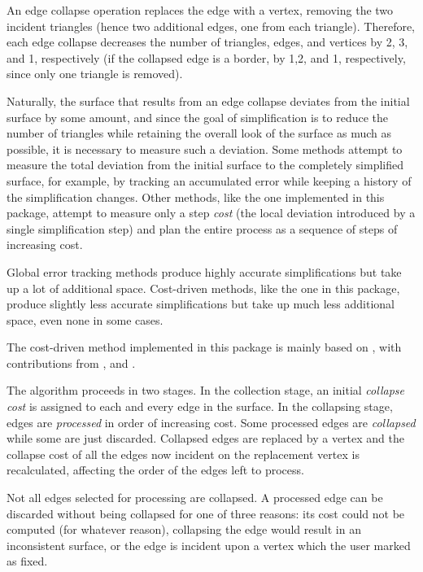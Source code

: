 An edge collapse operation replaces the edge with a vertex, removing the two incident 
triangles (hence two additional edges, one from each triangle). Therefore, each edge collapse 
decreases the number of triangles, edges, and vertices by 2, 3, and 1, respectively 
(if the collapsed edge is a border, by 1,2, and 1, respectively, since only one triangle 
is removed).

Naturally, the surface that results from an edge collapse deviates from the initial 
surface by some amount, and since the goal of simplification is to reduce the number 
of triangles while retaining the overall look of the surface as much as possible, 
it is necessary to measure such a deviation. Some methods attempt to measure the 
total deviation from the initial surface to the completely simplified surface, 
for example, by tracking an accumulated error while keeping a history of the simplification 
changes. Other methods, like the one implemented in this package, attempt to measure only
a step {\em cost} (the local deviation introduced by a single simplification step) and 
plan the entire process as a sequence of steps of increasing cost. 

Global error tracking methods produce highly accurate simplifications but take up a lot 
of additional space. Cost-driven methods, like the one in this package, produce slightly 
less accurate simplifications but take up much less additional space, even none in some cases.

The cost-driven method implemented in this package is mainly based on \cite[Memoryless simplification]{cgal:lt-fmeps-98,cgal:lt-ems-99}, with contributions from \cite[Mesh Optimization]{hddms-mo-93}, \cite[Surface simplification using quadric error metrics]{gh-ssqem-97}
and \cite[Topology preserving edge contraction]{degn-tpec-98}.

The algorithm proceeds in two stages. In the collection stage, an initial {\em collapse cost} 
is assigned to each and every edge in the surface. In the collapsing stage, edges are 
{\em processed} in order of increasing cost. Some processed edges are {\em collapsed} 
while some are just discarded. Collapsed edges are replaced by a vertex and the collapse 
cost of all the edges now incident on the replacement vertex is recalculated, affecting 
the order of the edges left to process.

Not all edges selected for processing are collapsed. A processed edge can be discarded 
without being collapsed for one of three reasons: its cost could not be computed 
(for whatever reason), collapsing the edge would result in an inconsistent surface, 
or the edge is incident upon a vertex which the user marked as fixed.

